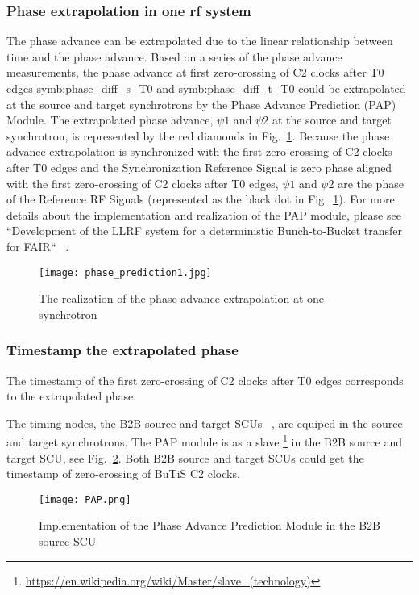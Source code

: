 \subsubsection{Phase extrapolation in one rf system}
The phase advance can be extrapolated due to the linear relationship between time and the phase advance. Based on a series of the phase advance measurements, the phase advance at first zero-crossing of C2 clocks after T0 edges \gls{symb:phase_diff_s_T0} and \gls{symb:phase_diff_t_T0} could be extrapolated at the source and target synchrotrons by the Phase Advance Prediction (\gls{PAP}) Module. The extrapolated phase advance, $\psi1$ and $\psi2$ at the source and target synchrotron, is represented by the red diamonds in Fig.~\ref{phase_prediction1}. Because the phase advance extrapolation is synchronized with the first zero-crossing of C2 clocks after T0 edges and the Synchronization Reference Signal is zero phase aligned with the first zero-crossing of C2 clocks after T0 edges, $\psi1$ and $\psi2$ are the phase of the Reference RF Signals (represented as the black dot in Fig.~\ref{phase_prediction1}). For more details about the implementation and realization of the PAP module, please see ``Development of the LLRF system for a deterministic Bunch-to-Bucket transfer for FAIR`` ~\cite{ferrand_development_????}.   
\begin{figure}[H]
   \centering   
   \texttt{[image: phase\_prediction1.jpg]}
   \caption{The realization of the phase advance extrapolation at one synchrotron}
   \label{phase_prediction1}
\end{figure}
\subsubsection{Timestamp the extrapolated phase}
The timestamp of the first zero-crossing of C2 clocks after T0 edges corresponds to the extrapolated phase. 

The timing nodes, the B2B source and target SCUs ~\cite{beck_new_2012, thieme_scu_2013}, are equiped in the source and target synchrotrons. The PAP module is as a slave \footnote{\url{https://en.wikipedia.org/wiki/Master/slave_(technology)}} in the B2B source and target SCU, see Fig.~\ref{PAP}. Both B2B source and target SCUs could get the timestamp of zero-crossing of \gls{BuTiS} C2 clocks. 
 \begin{figure}[!htb]
   \centering   
   \texttt{[image: PAP.png]}
   \caption{Implementation of the Phase Advance Prediction Module in the B2B source SCU}
   \label{PAP}
\end{figure}

